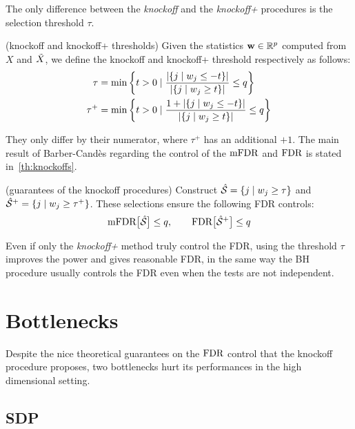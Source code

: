 The only difference between the \emph{knockoff} and the \emph{knockoff+} procedures is the selection threshold $\tau$.
\begin{definition}
    (knockoff and knockoff+ thresholds)
    Given the statistics $\mathbf{w} \in \mathbb{R}^p$ computed from $X$ and $\tilde{X}$,
    we define the knockoff and knockoff+ threshold respectively as follows:
    \begin{align}
        \tau &=
        \min\left\{
            t > 0 \mid \frac
                { \left\lvert\left\{ j \mid w_j \leq -t \right\}\right\rvert }
                { \left\lvert\left\{ j \mid w_j \geq t \right\}\right\rvert }
            \leq q
        \right\}\label{eq:knock_thres}\\
        \tau^+ &=
        \min\left\{
            t > 0 \mid \frac
                { 1 + \left\lvert\left\{ j \mid w_j \leq -t \right\}\right\rvert }
                { \left\lvert\left\{ j \mid w_j \geq t \right\}\right\rvert }
            \leq q
        \right\}\label{eq:knockp_thres}
    \end{align}
\end{definition}
They only differ by their numerator, where $\tau^+$ has an additional $+1$.
The main result of Barber-Candès regarding the control of the $\text{mFDR}$ and $\text{FDR}$ is stated in~\ref{th:knockoffs}.
\begin{theorem}\label{th:knockoffs}
    (guarantees of the knockoff procedures)
    Construct $\hat{\mathcal{S}} = \left\{ j \mid w_j \geq \tau \right\}$
    and $\hat{\mathcal{S}}^+ = \left\{ j \mid w_j \geq \tau^+ \right\}$.
    These selections ensure the following FDR controls:
    \begin{equation}
        \text{mFDR}\big[ \hat{\mathcal{S}} \big] \leq q
        ,\qquad
        \text{FDR}\big[ \hat{\mathcal{S}}^+ \big] \leq q
    \end{equation}
\end{theorem}
Even if only the \textit{knockoff+} method truly control the FDR,
using the threshold $\tau$ improves the power and gives reasonable FDR,
in the same way the BH procedure usually controls the FDR even when the tests are not independent.

\section{Bottlenecks}\label{sec:kb}

Despite the nice theoretical guarantees on the $\text{FDR}$ control that the knockoff procedure proposes,
two bottlenecks hurt its performances in the high dimensional setting.

\subsection{SDP}\label{subsec:bot_sdp}

